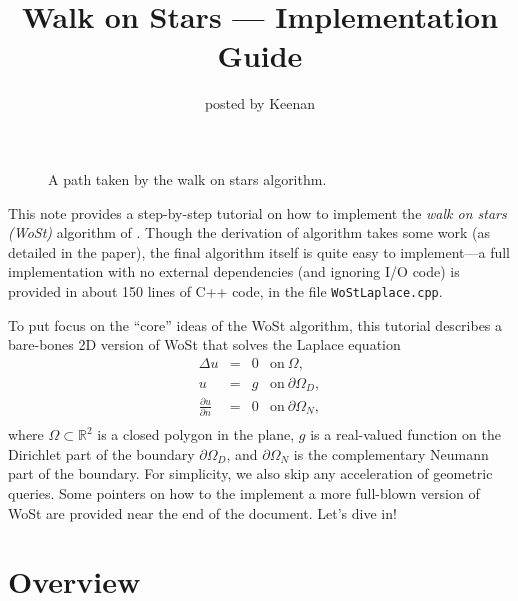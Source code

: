 \documentclass{article}
\title{Walk on Stars --- Implementation Guide}
\author{posted by Keenan}
\newcommand{\code}[1]{\texttt{#1}}
\newcommand{\todo}[1]{\textbf{\hl{TODO: #1}}}
\begin{document}
\maketitle

\begin{figure}[h!]
   \centering
   
   \caption{A path taken by the walk on stars algorithm.\label{fig:WalkOnStars}}
\end{figure}


This note provides a step-by-step tutorial on how to implement the \emph{walk on stars (WoSt)} algorithm of \citet{Sawhney:2023:WoSt}.  Though the derivation of algorithm takes some work (as detailed in the paper), the final algorithm itself is quite easy to implement---a full implementation with no external dependencies (and ignoring I/O code) is provided in about 150 lines of C++ code, in the file \code{WoStLaplace.cpp}.

To put focus on the ``core'' ideas of the WoSt algorithm, this tutorial describes a bare-bones 2D version of WoSt that solves the Laplace equation
\[
   \begin{array}{rcll}
      \Delta u &=& 0 & \text{on}\ \Omega, \\
             u &=& g & \text{on}\ \partial\Omega_D, \\
             \tfrac{\partial u}{\partial n} &=& 0 & \text{on}\ \partial\Omega_N, \\
   \end{array}
\]
where \(\Omega \subset \mathbb{R}^2\) is a closed polygon in the plane, \(g\) is a real-valued function on the Dirichlet part of the boundary \(\partial\Omega_D\), and \(\partial\Omega_N\) is the complementary Neumann part of the boundary.  For simplicity, we also skip any acceleration of geometric queries.  Some pointers on how to the implement a more full-blown version of WoSt are provided near the end of the document.  Let's dive in!

\section{Overview}
\label{sec:Overview}
\end{document}
